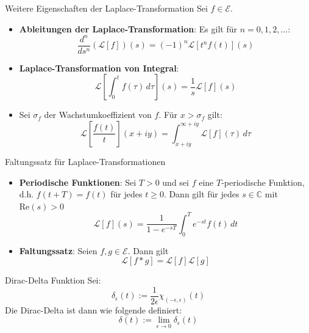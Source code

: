 \documentclass[a4paper,10pt]{article}
\def\Re{\text{Re}}
\begin{document}
\begin{mainbox}{Weitere Eigenschaften der Laplace-Transformation}
  Sei \(f\in\mathcal{E}\).
  \begin{itemize}
    \item{
      \textbf{Ableitungen der Laplace-Transformation}: Es gilt für \(n=0,1,2,\dots\):
       \begin{equation*} \frac{d^n}{ds^n}(\mathcal{L}[f])(s)=(-1)^n\mathcal{L}[t^nf(t)](s) \end{equation*}
    }

    \item{
      \textbf{Laplace-Transformation von Integral}:
      \begin{equation*} \mathcal{L}\left[\int_0^t f(\tau)\,d\tau\right](s)=\frac{1}{s}\mathcal{L}[f](s) \end{equation*}
    }

    \item{
      Sei \(\sigma_f\) der Wachstumkoeffizient von \(f\). Für \(x>\sigma_f\) gilt: \begin{equation*} \mathcal{L}\left[\frac{f(t)}{t}\right](x+ i y)=\int_{x+ i y}^{\infty+ i y} \mathcal{L}[f](\tau)\,d\tau \end{equation*}
    }
  \end{itemize}
\end{mainbox}

\begin{mainbox}{Faltungssatz für Laplace-Transformationen}
  \begin{itemize}
    \item{
      \textbf{Periodische Funktionen}: Sei \(T>0\) und sei \(f\) eine \(T\)-periodische Funktion, d.h. \(f(t+T)=f(t)\) für jedes \(t\geq0\). Dann gilt für jedes \(s\in\mathbb{C}\) mit \(\Re(s)>0\) \begin{equation*} \mathcal{L}[f](s)=\frac{1}{1-e^{-sT}}\int_0^Te^{-st}f(t)\,dt \end{equation*}
    }
    \item{
      \textbf{Faltungssatz}: Seien \(f,g\in\mathcal{E}\). Dann gilt \begin{equation*} \mathcal{L}[f*g]=\mathcal{L}[f]\mathcal{L}[g] \end{equation*}
    }
  \end{itemize}
\end{mainbox}

\begin{subbox}{Dirac-Delta Funktion}
  Sei: \begin{equation*} \delta_\epsilon(t):= \frac{1}{2\epsilon}\chi_{(-\epsilon,\epsilon)}(t) \end{equation*} Die Dirac-Delta ist dann wie folgende definiert: \begin{equation*} \delta(t):=\lim_{\epsilon\to0}\delta_\epsilon(t) \end{equation*}
\end{subbox}
\end{document}
